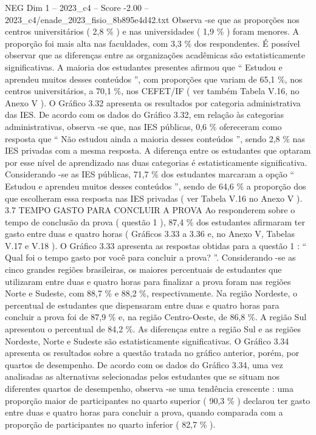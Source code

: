 \begin{textsample}{NEG Dim 1 – 2023\_c4 – Score -2.00 – 2023\_c4/enade\_2023\_fisio\_8b895e4d42.txt}
Observa -se que as proporções nos centros universitários ( 2,8 \% ) e nas universidades ( 1,9 \% ) foram menores.
A proporção foi mais alta nas faculdades, com 3,3 \% dos respondentes.
É possível observar que as diferenças entre as organizações acadêmicas são estatisticamente significativas.
A maioria dos estudantes presentes afirmou que “ Estudou e aprendeu muitos desses conteúdos ”, com proporções que variam de 65,1 \%, nos centros universitários, a 70,1 \%, nos CEFET/IF ( ver também Tabela V.16, no Anexo V ).
O Gráfico 3.32 apresenta os resultados por categoria administrativa das IES.
De acordo com os dados do Gráfico 3.32, em relação às categorias administrativas, observa -se que, nas IES públicas, 0,6 \% ofereceram como resposta que “ Não estudou ainda a maioria desses conteúdos ”, sendo 2,8 \% nas IES privadas com a mesma resposta.
A diferença entre os estudantes que optaram por esse nível de aprendizado nas duas categorias é estatisticamente significativa.
Considerando -se as IES públicas, 71,7 \% dos estudantes marcaram a opção “ Estudou e aprendeu muitos desses conteúdos ”, sendo de 64,6 \% a proporção dos que escolheram essa resposta nas IES privadas ( ver Tabela V.16 no Anexo V ). 3.7 TEMPO GASTO PARA CONCLUIR A PROVA Ao responderem sobre o tempo de conclusão da prova ( questão 1 ), 87,4 \% dos estudantes afirmaram ter gasto entre duas e quatro horas ( Gráficos 3.33 a 3.36 e, no Anexo V, Tabelas V.17 e V.18 ).
O Gráfico 3.33 apresenta as respostas obtidas para a questão 1 : “ Qual foi o tempo gasto por você para concluir a prova? ”.
Considerando -se as cinco grandes regiões brasileiras, os maiores percentuais de estudantes que utilizaram entre duas e quatro horas para finalizar a prova foram nas regiões Norte e Sudeste, com 88,7 \% e 88,2 \%, respectivamente.
Na região Nordeste, o percentual de estudantes que dispensaram entre duas e quatro horas para concluir a prova foi de 87,9 \% e, na região Centro-Oeste, de 86,8 \%.
A região Sul apresentou o percentual de 84,2 \%.
As diferenças entre a região Sul e as regiões Nordeste, Norte e Sudeste são estatisticamente significativas.
O Gráfico 3.34 apresenta os resultados sobre a questão tratada no gráfico anterior, porém, por quartos de desempenho.
De acordo com os dados do Gráfico 3.34, uma vez analisadas as alternativas selecionadas pelos estudantes que se situam nos diferentes quartos de desempenho, observa -se uma tendência crescente : uma proporção maior de participantes no quarto superior ( 90,3 \% ) declarou ter gasto entre duas e quatro horas para concluir a prova, quando comparada com a proporção de participantes no quarto inferior ( 82,7 \% ).

\end{textsample}
